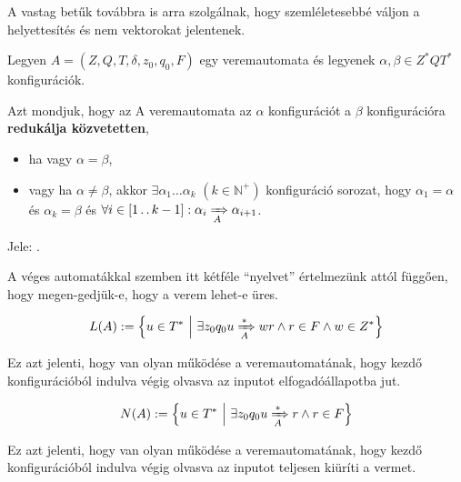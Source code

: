 A vastag betűk továbbra is arra szolgálnak, hogy szemléletesebbé váljon a helyettesítés és nem vektorokat jelentenek.

\begin{tcolorbox}
	\begin{definition}[Redukció]
		Legyen $A = (Z, Q, T, \delta, z_0, q_0, F)$ egy veremautomata és
		legyenek $\alpha, \beta \in Z^*QT^*$ konfigurációk.
		
		Azt mondjuk, hogy az A veremautomata az $\alpha$ konfigurációt
		a $\beta$ konfigurációra \textbf{redukálja közvetetten}, 
		\begin{itemize}
			\item ha vagy $\alpha = \beta$,
			\item vagy ha $\alpha \neq \beta$, akkor $\exists \alpha_1 \dots \alpha_k$ $(k \in \mathbb{N}^+)$ konfiguráció sorozat, hogy $\alpha_1 = \alpha$ és $\alpha_k = \beta$ és $\forall i \in [1 \operatorname{..} k-1] : \alpha_i \xRightarrow[{A}]{} \alpha_{i+1}$.
		\end{itemize}
		
		Jele:  .
	\end{definition}
\end{tcolorbox}

A véges automatákkal szemben itt kétféle ``nyelvet'' értelmezünk attól függően, hogy megen-gedjük-e, hogy a verem lehet-e üres.

\begin{tcolorbox}
	\begin{definition}
		\[ L(A) := \left\{  u \in T^* ~ \middle\vert ~ \exists z_0 q_0 u \xRightarrow[{A}]{*} wr \land r \in F \land w \in Z^* \right\} \]
	\end{definition}
\end{tcolorbox}

Ez azt jelenti, hogy van olyan működése a veremautomatának, hogy
kezdő konfigurációból indulva végig olvasva az inputot elfogadóállapotba jut.

\begin{tcolorbox}
	\begin{definition}
		\[ N(A) := \left\{  u \in T^* ~ \middle\vert ~ \exists z_0 q_0 u \xRightarrow[{A}]{*} r \land r \in F \right\} \]
	\end{definition}
\end{tcolorbox}

Ez azt jelenti, hogy van olyan működése a veremautomatának, hogy
kezdő konfigurációból indulva végig olvasva az inputot teljesen kiüríti a vermet.

